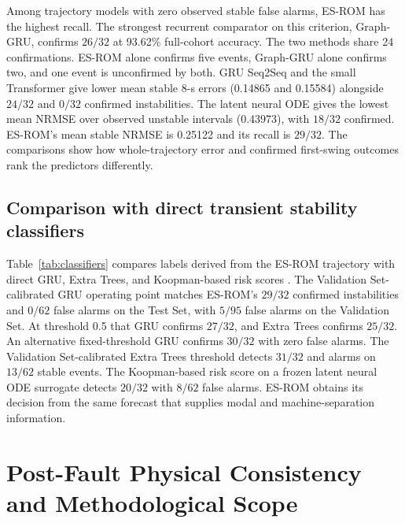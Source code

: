 \documentclass[journal]{IEEEtran}
\begin{document}
Among trajectory models with zero observed stable false alarms, ES-ROM
has the highest recall. The strongest recurrent comparator on this
criterion, Graph-GRU, confirms \(26/32\) at 93.62\% full-cohort accuracy.
The two methods share 24 confirmations. ES-ROM alone confirms five
events, Graph-GRU alone confirms two, and one event is unconfirmed by
both. GRU Seq2Seq and the small Transformer give lower mean stable
8-s errors (0.14865 and 0.15584) alongside \(24/32\) and \(0/32\)
confirmed instabilities. The latent neural ODE gives the lowest mean
NRMSE over observed unstable intervals (0.43973), with \(18/32\)
confirmed. ES-ROM's mean stable NRMSE is 0.25122 and its recall
is \(29/32\). The comparisons show how whole-trajectory error and
confirmed first-swing outcomes rank the predictors differently.

\subsection{Comparison with direct transient stability classifiers}
Table~\ref{tab:classifiers} compares labels derived from the ES-ROM
trajectory with direct GRU, Extra Trees, and Koopman-based risk scores
\cite{chen2021adaptive,geurts2006extra,pcdk2026}. The Validation
Set-calibrated GRU operating point matches ES-ROM's \(29/32\) confirmed
instabilities and \(0/62\) false alarms on the Test Set, with \(5/95\)
false alarms on the Validation Set. At threshold 0.5 that GRU confirms
\(27/32\), and Extra Trees confirms \(25/32\). An alternative
fixed-threshold GRU confirms \(30/32\) with zero false alarms. The
Validation Set-calibrated Extra Trees threshold detects \(31/32\) and
alarms on \(13/62\) stable events. The Koopman-based risk score on a frozen
latent neural ODE surrogate detects \(20/32\) with \(8/62\) false alarms.
ES-ROM obtains its decision
from the same forecast that supplies modal and machine-separation
information.
\ClassifierTable


\section{Post-Fault Physical Consistency and Methodological Scope}
\label{sec:physics}
\end{document}
